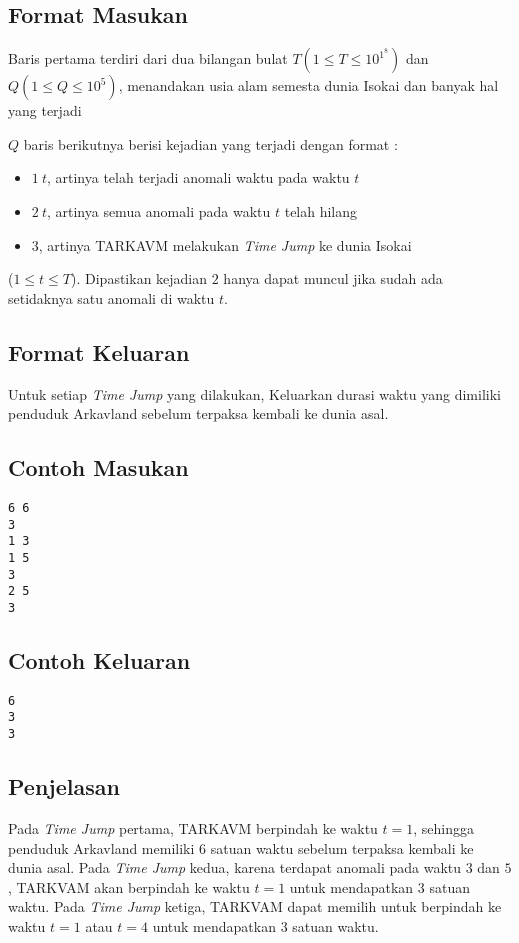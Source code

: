 \documentclass{article}
\begin{document}
\subsection*{Format Masukan}

Baris pertama terdiri dari dua bilangan bulat $T (1 \leq T \leq 10^1^8)$ dan $Q (1 \leq Q \leq 10^5)$, menandakan usia alam semesta dunia Isokai dan banyak hal yang terjadi

$Q$ baris berikutnya berisi kejadian yang terjadi dengan format :
\begin{itemize}
    \setlength\itemsep{0pt}
	\item$1\:t$, artinya telah terjadi anomali waktu pada waktu $t$
	\item$2\:t$, artinya semua anomali pada waktu $t$ telah hilang
	\item$3$, artinya TARKAVM melakukan \textit{Time Jump} ke dunia Isokai
\end{itemize}
($1 \leq t \leq T$). Dipastikan kejadian $2$ hanya dapat muncul jika sudah ada setidaknya satu anomali di waktu $t$.

\subsection*{Format Keluaran}

Untuk setiap \textit{Time Jump} yang dilakukan, Keluarkan durasi waktu yang dimiliki penduduk Arkavland sebelum terpaksa kembali ke dunia asal.
\\

\pagebreak

\begin{multicols}{2}
\subsection*{Contoh Masukan}
\begin{lstlisting}
6 6
3
1 3
1 5
3
2 5
3

\end{lstlisting}
\columnbreak
\subsection*{Contoh Keluaran}
\begin{lstlisting}
6
3
3
\end{lstlisting}
\vfill
\null
\end{multicols}

\subsection*{Penjelasan}
Pada \textit{Time Jump} pertama, TARKAVM berpindah ke waktu $t = 1$, sehingga penduduk Arkavland memiliki 6 satuan waktu sebelum terpaksa kembali ke dunia asal. Pada \textit{Time Jump} kedua, karena terdapat anomali pada waktu $3$ dan $5$, TARKVAM akan berpindah ke waktu $t = 1$ untuk mendapatkan $3$ satuan waktu. Pada \textit{Time Jump} ketiga, TARKVAM dapat memilih untuk berpindah ke waktu $t = 1$ atau $t = 4$ untuk mendapatkan $3$ satuan waktu.

\pagebreak
\end{document}
